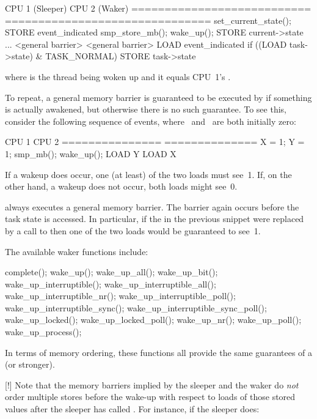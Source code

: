 \begin{VerbatimU}
	CPU 1 (Sleeper)             CPU 2 (Waker)
	=========================== ===============================
	set_current_state();        STORE event_indicated
	  smp_store_mb();           wake_up();
	    STORE current->state      ...
	    <general barrier>         <general barrier>
	LOAD event_indicated          if ((LOAD task->state) & TASK_NORMAL)
	                                STORE task->state
\end{VerbatimU}

where  is the thread being woken up and it equals CPU~1's .

To repeat, a general memory barrier is guaranteed to be executed by
 if something is actually awakened, but otherwise there is
no such guarantee.
To see this, consider the following sequence of events, where~ and~ are both
initially zero:

\begin{VerbatimU}
	CPU 1           CPU 2
	=============== ==============
	X = 1;          Y = 1;
	smp_mb();       wake_up();
	LOAD Y          LOAD X
\end{VerbatimU}

If a wakeup does occur, one (at least) of the two loads must see~1.
If, on the other hand, a wakeup does not occur, both loads might see~0.

 always executes a general memory barrier.
The barrier again occurs before the task state is accessed.
In particular, if the  in the previous snippet were replaced
by a call to  then one of the two loads would be
guaranteed to see~1.

The available waker functions include:

\begin{VerbatimU}
	complete();
	wake_up();
	wake_up_all();
	wake_up_bit();
	wake_up_interruptible();
	wake_up_interruptible_all();
	wake_up_interruptible_nr();
	wake_up_interruptible_poll();
	wake_up_interruptible_sync();
	wake_up_interruptible_sync_poll();
	wake_up_locked();
	wake_up_locked_poll();
	wake_up_nr();
	wake_up_poll();
	wake_up_process();
\end{VerbatimU}

In terms of memory ordering, these functions all provide the same guarantees of
a  (or stronger).

[!] Note that the memory barriers implied by the sleeper and the waker do
\emph{not} order multiple stores before the wake-up with respect to loads
of those stored values after the sleeper has called .
For instance, if the sleeper does:

